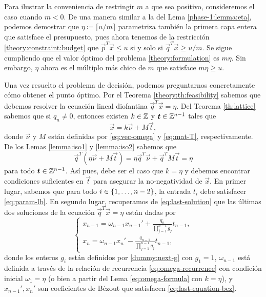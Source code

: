 \begin{observation}
	Para ilustrar la conveniencia de restringir $m$ a que sea positivo, consideremos el caso cuando
	$m < 0$. De una manera similar a la del Lema \ref{phase-1:lemma:eta}, podemos demostrar que
	$\eta \coloneq \lceil u/m \rceil$ parametriza también la primera capa entera que satisface el
	presupuesto, pues ahora tenemos de la restricción \eqref{theory:constraint:budget} que
	$\vec{p}^T\vec{x} \leq u$ si y solo si $\vec{q}^T\vec{x} \geq u/m$. Se sigue cumpliendo que el
	valor óptimo del problema \eqref{theory:formulation} es $m\eta$. Sin embargo, $\eta$ ahora es el
	múltiplo más chico de $m$ que satisface $m\eta \geq u$.
\end{observation}

Una vez resuelto el problema de decisión, podemos preguntarnos concretamente cómo obtener el punto
óptimo. Por el Teorema \ref{theory:th:feasibility} sabemos que debemos resolver la ecuación lineal
diofantina $\vec{q}^T\vec{x} = \eta$. Del Teorema \ref{th:lattice} sabemos que si $q_n \neq 0$,
entonces existen $k \in \mathbb{Z}$ y $\boldsymbol{t} \in \mathbb{Z}^{n-1}$ tales que
\begin{equation*}
	\vec{x} = k\vec{\nu} + M\vec{t},
\end{equation*}
donde $\vec{\nu}$ y $M$ están definidas por \eqref{eq:vec-omega} y \eqref{eq:mat-T},
respectivamente. De los Lemas \ref{lemma:iso1} y \ref{lemma:iso2} sabemos que
\begin{equation*}
	\vec{q}^T\left(\eta\vec{\nu} + M\vec{t}\right) = \eta\vec{q}^T\vec{\nu} + \vec{q}^TM\vec{t} = \eta
\end{equation*}
para todo $\boldsymbol{t} \in \mathbb{Z}^{n-1}$. Así pues, debe ser el caso que $k = \eta$ y debemos encontrar
condiciones suficientes en $\vec{t}$ para asegurar la no-negatividad de $\vec{x}$. En primer lugar,
sabemos que para todo $i \in \lbrace 1, \ldots, n - 2 \rbrace$, la entrada $t_i$ debe satisfacer
\eqref{eq:param-lb}. En segundo lugar, recuperamos de \eqref{eq:last-solution} que las últimas dos
soluciones de la ecuación $\vec{q}^T\vec{x} = \eta$ están dadas por
\begin{equation*}
	\begin{cases}
		x_{n-1} = \omega_{n-1}x_{n-1}' + \frac{q_n}{\prod_{j=1}^{n-1}g_j}t_{n-1}, \\
		x_n = \omega_{n-1}x_n' - \frac{q_{n-1}}{\prod_{j=1}^{n-1}g_j}t_{n-1},
	\end{cases}
\end{equation*}
donde los enteros $g_i$ están definidos por \eqref{dummy:next-g} con $g_1 = 1$, $\omega_{n-1}$ está
definida a través de la relación de recurrencia \eqref{eq:omega-recurrence} con condición inicial
$\omega_1 = \eta$ (o bien a partir del Lema \ref{eq:omega-formula} con $k = \eta$), y $x_{n-1}',
x_n'$ son coeficientes de Bézout que satisfacen \eqref{eq:last-equation-bez}.

